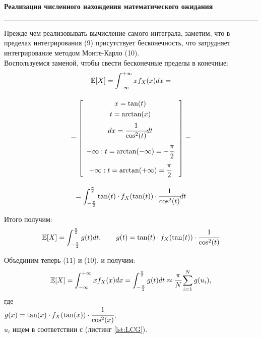 \documentclass[a4paper, 14pt]{extarticle}
\begin{document}
\paragraph{Реализация численного нахождения математического ожидания}\vspace{-20pt}\rule{\linewidth}{0.1mm}

Прежде чем реализовывать вычисление самого интеграла, заметим, что в пределах 
интегрирования (9) присутствует бесконечность, что затрудняет интегрирование 
методом Монте-Карло (10). \\
Воспользуемся заменой, чтобы свести бесконечные пределы в конечные:
\begin{gather*}
  \mathbb{E}[X] = \int_{-\infty}^{+\infty} x f_X(x)dx = \\[1em]
  = \left[\hspace{5pt}
    \begin{gathered}
    x       = \tan(t)                             \\
    t       = \arctan(x)                          \\
    dx      = \cfrac{1}{\cos^2(t)} dt             \\
    -\infty : t=\arctan(-\infty)= -\cfrac{\pi}{2} \\ 
    +\infty : t=\arctan(+\infty)= \cfrac{\pi}{2}  \\
    \end{gathered}\,
  \hspace{5pt}\right] = \\[1em]
  = \int_{-\frac{\pi}{2}}^{\frac{\pi}{2}} \tan(t) \cdot f_X(\tan(t)) \cdot \cfrac{1}{\cos^2(t)} dt
\end{gather*}

Итого получим:
\begin{equation}
  \mathbb{E}[X] = \int_{-\frac{\pi}{2}}^{\frac{\pi}{2}} g(t) dt, 
  \qquad g(t) = \tan(t) \cdot f_X(\tan(t)) \cdot \cfrac{1}{\cos^2(t)}
\end{equation}

Объединим теперь (11) и (10), и получим:
\begin{equation}
  \mathbb{E}[X] = \int_{-\infty}^{+\infty} x f_X(x)dx = 
  \int_{-\frac{\pi}{2}}^{\frac{\pi}{2}} g(t) dt \approx 
  \cfrac{\pi}{N} \sum_{i=1}^N g(u_i), 
\end{equation}
где\\
$g(x) = \tan(x) \cdot f_X(\tan(x)) \cdot \cfrac{1}{\cos^2(x)}$, \\[1em]
$u_i$ ищем в соответствии с (листинг \ref{lst:LCG}).\\
\end{document}
